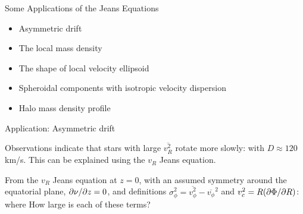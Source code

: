 \documentclass[letterpaper,landscape]{slides}
\begin{document}
\begin{slide}
\begin{center}
{\large \color{red} 
                   Some Applications of the Jeans Equations   }
\end{center}

\begin{itemize}
\item Asymmetric drift
\item The local mass density
\item The shape of local velocity ellipsoid
\item Spheroidal components with isotropic velocity dispersion
\item Halo mass density profile
\end{itemize}

\vfill
\end{slide}




\begin{slide}
\begin{center}
{\large \color{red} 
                  Application: Asymmetric drift   }
\end{center}

Observations indicate that stars with large $\overline{v_R^2}$ rotate more slowly:
with $D \approx 120$ km/s. This can be explained using the $v_R$ Jeans equation.


From the $v_R$ Jeans equation at $z=0$, with an assumed symmetry 
around the equatorial plane, ${\partial \nu / \partial z}=0$, and definitions
$\sigma_\phi^2 = \overline{v_\phi^2}- \overline{v_\phi}^2$ and
$v_c^2=R(\partial \Phi / \partial R)$:
where
How large is each of these terms?
\vfill
\end{slide}
\end{document}
